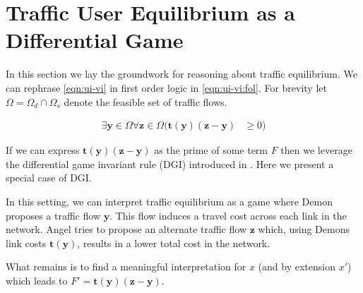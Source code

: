 \section{Traffic User Equilibrium as a Differential Game}

In this section we lay the groundwork for reasoning about traffic equilibrium. We can rephrase \eqref{eqn:ui-vi} in first order logic in \eqref{eqn:ui-vi:fol}. For brevity let $\Omega = \Omega_d \cap \Omega_s$ denote the feasible set of traffic flows.

\begin{align}
    \exists \mathbf{y}\in \Omega \forall \mathbf{z}\in \Omega (\mathbf{t}(\mathbf{y})(\mathbf{z}- \mathbf{y}) &\geq 0) \label{eqn:ui-vi:fol}
\end{align}

If we can express $\mathbf{t}(\mathbf{y})(\mathbf{z}- \mathbf{y})$ as the prime of some term $F$ then we leverage the differential game invariant rule (DGI) introduced in \citet{DBLP:journals/tocl/Platzer17}. Here we present a special case of DGI.

\begin{prooftree}
\end{prooftree}

In this setting, we can interpret traffic equilibrium as a game where Demon proposes a traffic flow $\mathbf{y}$. This flow induces a travel cost across each link in the network. Angel tries to propose an alternate traffic flow $\mathbf{z}$ which, using Demons link costs $\mathbf{t}(\mathbf{y})$, results in a lower total cost in the network.

What remains is to find a meaningful interpretation for $x$ (and by extension $x'$) which leads to $F' = \mathbf{t}(\mathbf{y})(\mathbf{z}- \mathbf{y})$.
